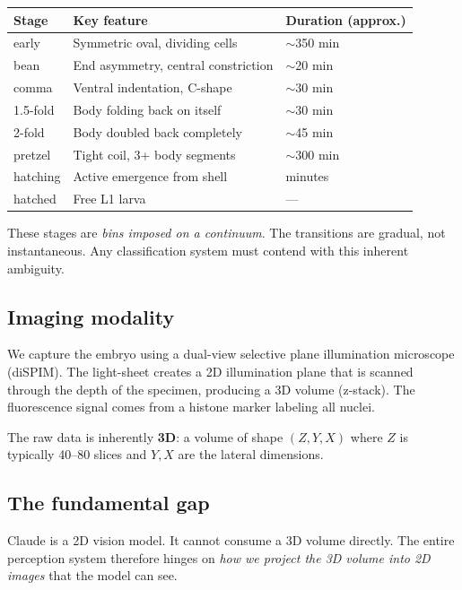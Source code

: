 \documentclass[11pt, a4paper]{article}
\begin{document}
\begin{center}
\small
\begin{tabular}{@{}lll@{}}
\toprule
\textbf{Stage} & \textbf{Key feature} & \textbf{Duration (approx.)} \\
\midrule
early    & Symmetric oval, dividing cells         & $\sim$350 min \\
bean     & End asymmetry, central constriction     & $\sim$20 min \\
comma    & Ventral indentation, C-shape            & $\sim$30 min \\
1.5-fold & Body folding back on itself             & $\sim$30 min \\
2-fold   & Body doubled back completely            & $\sim$45 min \\
pretzel  & Tight coil, 3+ body segments            & $\sim$300 min \\
hatching & Active emergence from shell             & minutes \\
hatched  & Free L1 larva                           & --- \\
\bottomrule
\end{tabular}
\end{center}

These stages are \emph{bins imposed on a continuum}. The transitions are gradual,
not instantaneous. Any classification system must contend with this inherent
ambiguity.

\subsection{Imaging modality}

We capture the embryo using a dual-view selective plane illumination microscope
(diSPIM). The light-sheet creates a 2D illumination plane that is scanned through
the depth of the specimen, producing a 3D volume (z-stack). The fluorescence
signal comes from a histone marker labeling all nuclei.

The raw data is inherently \textbf{3D}: a volume of shape $(Z, Y, X)$ where $Z$
is typically 40--80 slices and $Y, X$ are the lateral dimensions.

\subsection{The fundamental gap}

Claude is a 2D vision model. It cannot consume a 3D volume directly. The entire
perception system therefore hinges on \emph{how we project the 3D volume into 2D
images} that the model can see.
\end{document}
